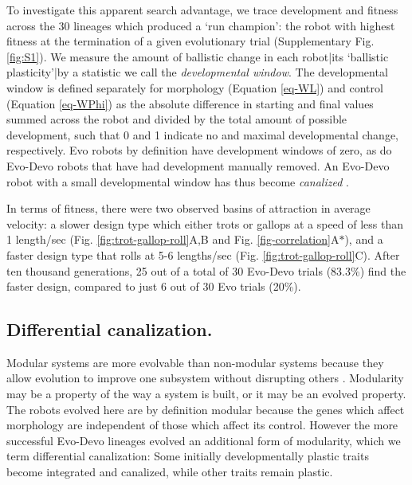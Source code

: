 To investigate this apparent search advantage, we trace development and fitness across the 30 lineages which produced a `run champion': the robot with highest fitness at the termination of a given evolutionary trial (Supplementary Fig. \ref{fig:S1}).%
We measure the amount of ballistic change in each robot|its `ballistic plasticity'|by a statistic we call the \textit{developmental window}.
The developmental window is defined separately for morphology (Equation \ref{eq-WL}) and control (Equation \ref{eq-WPhi}) as the absolute difference in starting and final values summed across the robot and divided by the total amount of possible development, such that 0 and 1 indicate no and maximal developmental change, respectively.
Evo robots by definition have development windows of zero, as do Evo-Devo robots that have had development manually removed.
An Evo-Devo robot with a small developmental window has thus become \textit{canalized} \cite{waddington1942canalization}.


In terms of fitness, there were two observed basins of attraction in average velocity: a slower design type which either trots or gallops at a speed of less than 1 length/sec (Fig. \ref{fig:trot-gallop-roll}A,B and Fig. \ref{fig-correlation}A{\Large$\ast$}), and a faster design type that rolls at 5-6 lengths/sec (Fig. \ref{fig:trot-gallop-roll}C). 
After ten thousand generations, 25 out of a total of 30 Evo-Devo trials (83.3\%) find the faster design, compared to just 6 out of 30 Evo trials (20\%).


\subsection*{Differential canalization.}

Modular systems are more evolvable than non-modular systems because they allow evolution to improve one subsystem without disrupting others \cite{wagner1996perspective,lipson2007principles}.
Modularity may be a property of the way a system is built, or it may be an evolved property.
The robots evolved here are by definition modular because the genes which affect morphology are independent of those which affect its control.
However the more successful Evo-Devo lineages evolved an additional form of modularity, which we term differential canalization:
Some initially developmentally plastic traits become integrated and canalized, while other traits remain plastic.



